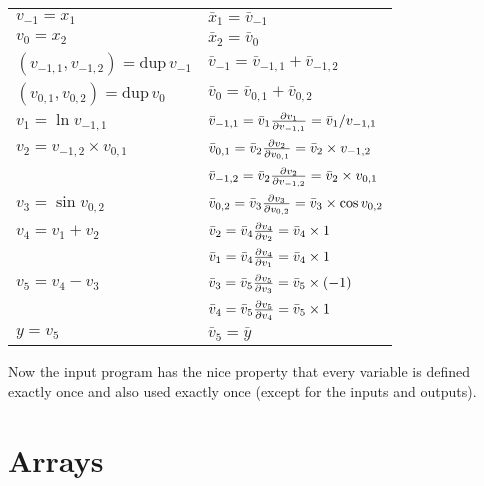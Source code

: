 \documentclass[12pt]{article}
\newcommand{\dup}{\mathrm{dup}}
\begin{document}
\begin{tabular}[t]{ll}

  $v_{-1} = x_1$
  &
  $\bar{x}_1 = \bar{v}_{-1}$
  \\
  
  $v_{0} = x_2$
  &
  $\bar{x}_2 = \bar{v}_{0}$
  \\

  \((v_{-1,1}, v_{-1,2}) = \dup \, v_{-1}\)
  &
  \(\bar{v}_{-1} = \bar{v}_{-1,1} + \bar{v}_{-1,2}\)
  \\

  \((v_{0,1}, v_{0,2}) = \dup \, v_0\)
  &
  \(\bar{v}_{0} = \bar{v}_{0,1} + \bar{v}_{0,2}\)
  \\

  $v_1 = \ln{v_{-1,1}}$
  &
  \(\bar{v}_{-1,1}
  = \bar{v}_{1} \frac{\partial v_{1}}{\partial v_{-1,1}}
  = \bar{v}_1 / v_{-1,1}
  \) \\

  $v_2 = v_{-1,2} \times v_{0,1}$
  &
  \(\bar{v}_{0,1}
  = \bar{v}_{2} \frac{\partial v_{2}}{\partial v_{0,1}}
  = \bar{v}_2 \times v_{-1,2}
  \) \\

  &
  \(\bar{v}_{-1,2}
  = \bar{v}_{2} \frac{\partial v_{2}}{\partial v_{-1,2}}
  = \bar{v}_2 \times v_{0,1}
  \) \\

  $v_3 = \sin{v_{0,2}}$
  &
  \(\bar{v}_{0,2}
  = \bar{v}_{3} \frac{\partial v_{3}}{\partial v_{0,2}}
  = \bar{v}_3 \times \cos v_{0,2}
  \) \\

  $v_4 = v_1 + v_2$
  &
  \(\bar{v}_2
  = \bar{v}_{4} \frac{\partial v_{4}}{\partial v_{2}}
  = \bar{v}_4 \times 1
  \) \\

  &
  \(\bar{v}_1
  = \bar{v}_{4} \frac{\partial v_{4}}{\partial v_{1}}
  = \bar{v}_4 \times 1
  \) \\

  $v_5 = v_4 - v_3$
  &
  \(\bar{v}_3
  = \bar{v}_{5} \frac{\partial v_{5}}{\partial v_{3}}
  = \bar{v}_5 \times (-1)
  \) \\
  
  &
  \(\bar{v}_4
  = \bar{v}_{5} \frac{\partial v_{5}}{\partial v_{4}}
  = \bar{v}_5 \times 1
  \) \\
  
  $y = v_5$
  &
  $\bar{v}_5 = \bar{y}$
  \\

\end{tabular}

Now the input program has the nice property that every variable is
defined exactly once and also used exactly once (except for the inputs
and outputs).

\section{Arrays}
\end{document}
